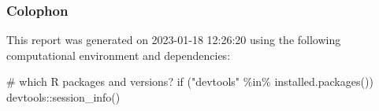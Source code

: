 \documentclass[
  super,
  preprint,
  3p]{elsarticle}
\newenvironment{Shaded}{\begin{snugshade}}{\end{snugshade}}
\newcommand{\CommentTok}[1]{\textcolor[rgb]{0.37,0.37,0.37}{#1}}
\newcommand{\ControlFlowTok}[1]{\textcolor[rgb]{0.00,0.23,0.31}{#1}}
\newcommand{\FunctionTok}[1]{\textcolor[rgb]{0.28,0.35,0.67}{#1}}
\newcommand{\NormalTok}[1]{\textcolor[rgb]{0.00,0.23,0.31}{#1}}
\newcommand{\SpecialCharTok}[1]{\textcolor[rgb]{0.37,0.37,0.37}{#1}}
\newcommand{\StringTok}[1]{\textcolor[rgb]{0.13,0.47,0.30}{#1}}
\begin{document}
\hypertarget{colophon}{%
\subsubsection{Colophon}\label{colophon}}

This report was generated on 2023-01-18 12:26:20 using the following
computational environment and dependencies:

\begin{Shaded}
\begin{Highlighting}[]
\CommentTok{\# which R packages and versions?}
\ControlFlowTok{if}\NormalTok{ (}\StringTok{"devtools"} \SpecialCharTok{\%in\%} \FunctionTok{installed.packages}\NormalTok{()) devtools}\SpecialCharTok{::}\FunctionTok{session\_info}\NormalTok{()}
\end{Highlighting}
\end{Shaded}
\end{document}
